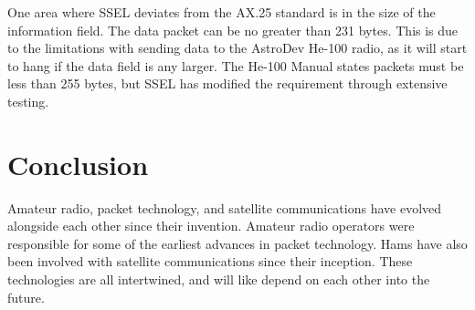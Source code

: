 \documentclass[letter,12pt]{article}
\begin{document}
		One area where SSEL deviates from the AX.25 standard is in the size of the information field.  The data packet can be no greater than 231 bytes.  This is due to the limitations with sending data to the AstroDev He-100 radio, as it will start to hang if the data field is any larger. The He-100 Manual states packets must be less than 255 bytes, but SSEL has modified the requirement through extensive testing. \cite{He-100_Manual}
		
\section{Conclusion}
	Amateur radio, packet technology, and satellite communications have evolved alongside each other since their invention.  Amateur radio operators were responsible for some of the earliest advances in packet technology. Hams have also been involved with satellite communications since their inception. These technologies are all intertwined, and will like depend on each other into the future.
		
\pagebreak		
\printbibliography
		
\end{document}

